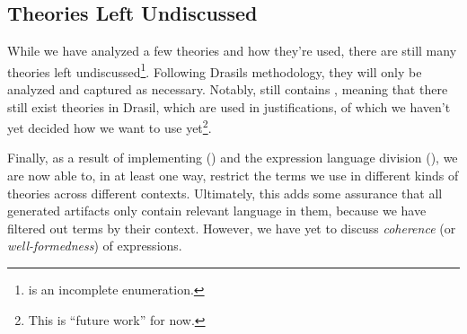 \subsection{Theories Left Undiscussed}
\label{chap:more-theory-kinds:sec:classify-all-the-theories:subsec:theories-left-undiscussed}

While we have analyzed a few theories and how they're used, there are still many
theories left undiscussed\footnote{\ModelKinds{} is an incomplete enumeration.}.
Following Drasils methodology, they will only be analyzed and captured as
necessary. Notably, \ModelKinds{} still contains \OthModel{}, meaning that there
still exist theories in Drasil, which are used in justifications, of which we
haven't yet decided how we want to use yet\footnote{This is ``future work'' for
now.}.

Finally, as a result of implementing \ModelKinds{} () and
the expression language division (), we are now able
to, in at least one way, restrict the terms we use in different kinds of
theories across different contexts. Ultimately, this adds some assurance that
all generated artifacts only contain relevant language in them, because we have
filtered out terms by their context. However, we have yet to discuss
\textit{coherence} (or \textit{well-formedness}) of expressions.
